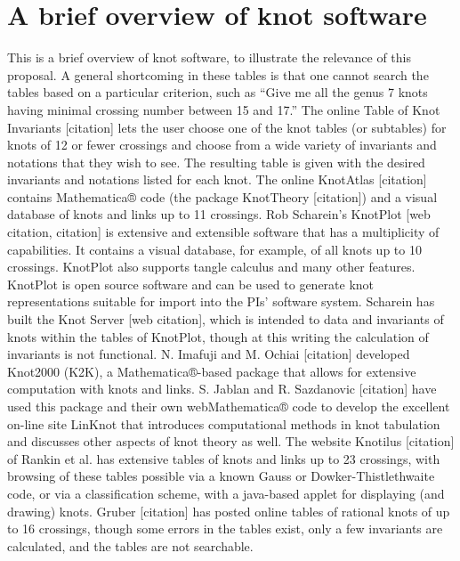 \documentclass[12pt]{amsart}
\begin{document}
\section{A brief overview of knot software}\label{sec:a_brief_overview_of_knot_software} %
This is a brief overview of knot software, to illustrate the relevance of this proposal. A general shortcoming in these tables is that one cannot search the tables based on a particular criterion, such as “Give me all the genus 7 knots having minimal crossing number between 15 and 17.”
The online Table of Knot Invariants [citation] lets the user choose one of the knot tables (or subtables) for knots of 12 or fewer crossings and choose from a wide variety of invariants and notations that they wish to see. The resulting table is given with the desired invariants and notations listed for each knot.
The online KnotAtlas [citation] contains Mathematica® code (the package KnotTheory [citation]) and a visual database of knots and links up to 11 crossings.
Rob Scharein’s KnotPlot [web citation, citation] is extensive and extensible software that has a multiplicity of capabilities. It contains a visual database, for example, of all knots up to 10 crossings. KnotPlot also supports tangle calculus and many other features. KnotPlot is open source software and can be used to generate knot representations suitable for import into the PIs’ software system. Scharein has built the Knot Server [web citation], which is intended to data and invariants of knots within the tables of KnotPlot, though at this writing the calculation of invariants is not functional.
N. Imafuji and M. Ochiai [citation] developed Knot2000 (K2K), a Mathematica®-based package that allows for extensive computation with knots and links. S. Jablan and R. Sazdanovic [citation] have used this package and their own webMathematica® code to develop the excellent on-line site LinKnot that introduces computational methods in knot tabulation and discusses other aspects of knot theory as well.
The website Knotilus [citation] of Rankin et al. has extensive tables of knots and links up to 23 crossings, with browsing of these tables possible via a known Gauss or Dowker-Thistlethwaite code, or via a classification scheme, with a java-based applet for displaying (and drawing) knots.
Gruber [citation] has posted online tables of rational knots of up to 16 crossings, though some errors in the tables exist, only a few invariants are calculated, and the tables are not searchable.
\end{document}
